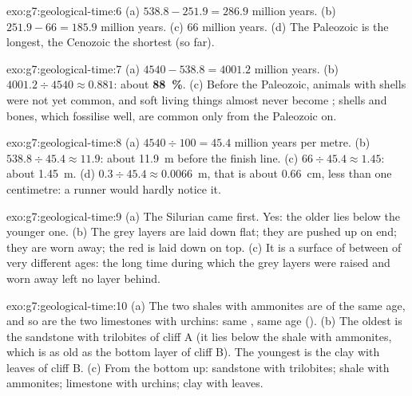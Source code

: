 \begin{solution}{exo:g7:geological-time:6}
(a) $538.8 - 251.9 = 286.9$ million years. (b) $251.9 - 66 = 185.9$
million years. (c) 66 million years. (d) The Paleozoic is the longest,
the Cenozoic the shortest (so far).
\end{solution}

\begin{solution}{exo:g7:geological-time:7}
(a) $4540 - 538.8 = 4001.2$ million years. (b) $4001.2 \div 4540
\approx 0.881$: about \textbf{88~\%}. (c) Before the Paleozoic, animals
with shells were not yet common, and soft living things almost never
become ; shells and bones, which fossilise well, are common only
from the Paleozoic on.
\end{solution}

\begin{solution}{exo:g7:geological-time:8}
(a) $4540 \div 100 = 45.4$ million years per metre. (b) $538.8 \div 45.4
\approx 11.9$: about \qty{11.9}{m} before the finish line. (c) $66 \div
45.4 \approx 1.45$: about \qty{1.45}{m}. (d) $0.3 \div 45.4 \approx
0.0066$~m, that is about \qty{0.66}{cm}, less than one centimetre: a
runner would hardly notice it.
\end{solution}

\begin{solution}{exo:g7:geological-time:9}
(a) The Silurian came first. Yes: the older  lies below the younger
one. (b) The grey layers are laid down flat; they are pushed up on end;
they are worn away; the red  is laid down on top. (c) It is a
surface of  between  of very different ages: the long time
during which the grey layers were raised and worn away left no layer
behind.
\end{solution}

\begin{solution}{exo:g7:geological-time:10}
(a) The two shales with ammonites are of the same age, and so are the
two limestones with  urchins: same , same age (). (b) The oldest is the sandstone with trilobites of
cliff A (it lies below the shale with ammonites, which is as old as the
bottom layer of cliff B). The youngest is the clay with leaves of cliff
B. (c) From the bottom up: sandstone with trilobites; shale with
ammonites; limestone with  urchins; clay with leaves.
\end{solution}

